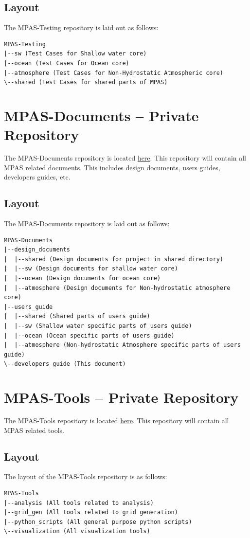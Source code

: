 \documentclass[11pt]{report}
\begin{document}
\subsection{Layout}
The MPAS-Testing repository is laid out as follows:
\begin{lstlisting}
MPAS-Testing
|--sw (Test Cases for Shallow water core)
|--ocean (Test Cases for Ocean core)
|--atmosphere (Test Cases for Non-Hydrostatic Atmospheric core)
\--shared (Test Cases for shared parts of MPAS)
\end{lstlisting}

\section{MPAS-Documents -- Private Repository}
The MPAS-Documents repository is located
\href{https://github.com/MPAS-Dev/MPAS-Documents}{here}. This repository will
contain all MPAS related documents. This includes design documents, users
guides, developers guides, etc.

\subsection{Layout}
The MPAS-Documents repository is laid out as follows:
\begin{lstlisting}
MPAS-Documents
|--design_documents
|  |--shared (Design documents for project in shared directory)
|  |--sw (Design documents for shallow water core)
|  |--ocean (Design documents for ocean core)
|  |--atmosphere (Design documents for Non-hydrostatic atmosphere core)
|--users_guide
|  |--shared (Shared parts of users guide)
|  |--sw (Shallow water specific parts of users guide)
|  |--ocean (Ocean specific parts of users guide)
|  |--atmosphere (Non-hydrostatic Atmosphere specific parts of users guide)
\--developers_guide (This document)
\end{lstlisting}

\section{MPAS-Tools -- Private Repository}
The MPAS-Tools repository is located
\href{https://github.com/MPAS-Dev/MPAS-Tools}{here}. This repository will
contain all MPAS related tools.

\subsection{Layout}
The layout of the MPAS-Tools repository is as follows:
\begin{lstlisting}
MPAS-Tools
|--analysis (All tools related to analysis)
|--grid_gen (All tools related to grid generation)
|--python_scripts (All general purpose python scripts)
\--visualization (All visualization tools)
\end{lstlisting}
\end{document}
